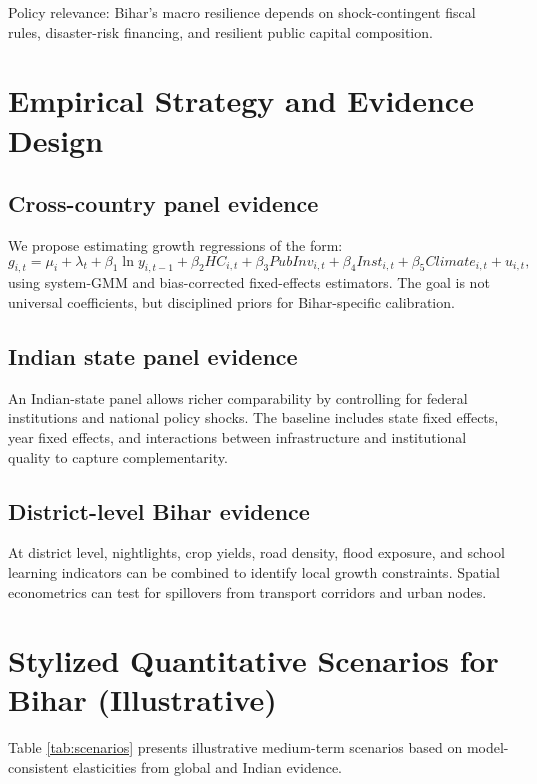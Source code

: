 \documentclass[preprint,12pt]{elsarticle}
\begin{document}
Policy relevance: Bihar's macro resilience depends on shock-contingent fiscal rules, disaster-risk financing, and resilient public capital composition.

\section{Empirical Strategy and Evidence Design}
\subsection{Cross-country panel evidence}
We propose estimating growth regressions of the form:
\begin{equation}
g_{i,t} = \mu_i + \lambda_t + \beta_1 \ln y_{i,t-1} + \beta_2 HC_{i,t} + \beta_3 PubInv_{i,t} + \beta_4 Inst_{i,t} + \beta_5 Climate_{i,t} + u_{i,t},
\end{equation}
using system-GMM and bias-corrected fixed-effects estimators. The goal is not universal coefficients, but disciplined priors for Bihar-specific calibration.

\subsection{Indian state panel evidence}
An Indian-state panel allows richer comparability by controlling for federal institutions and national policy shocks. The baseline includes state fixed effects, year fixed effects, and interactions between infrastructure and institutional quality to capture complementarity.

\subsection{District-level Bihar evidence}
At district level, nightlights, crop yields, road density, flood exposure, and school learning indicators can be combined to identify local growth constraints. Spatial econometrics can test for spillovers from transport corridors and urban nodes.

\section{Stylized Quantitative Scenarios for Bihar (Illustrative)}
Table \ref{tab:scenarios} presents illustrative medium-term scenarios based on model-consistent elasticities from global and Indian evidence.
\end{document}

